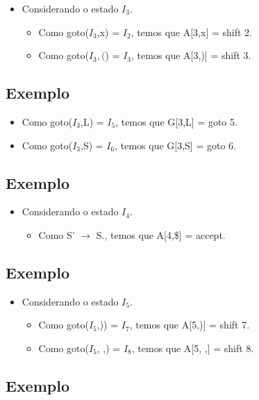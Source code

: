 \documentclass[11pt]{article}
\begin{document}
\begin{itemize}
\item Considerando o estado \(I_3\).
\begin{itemize}
\item Como goto(\(I_3\),x) = \(I_2\), temos que A[3,x] = shift 2.
\item Como goto(\(I_3,(\)) = \(I_3\), temos que A[3,)] = shift 3.
\end{itemize}
\end{itemize}
\subsection*{Exemplo}
\label{sec:org52592b6}

\begin{itemize}
\item Como goto(\(I_3\),L) = \(I_5\), temos que G[3,L] = goto 5.
\item Como goto(\(I_3\),S) = \(I_6\), temos que G[3,S] = goto 6.
\end{itemize}
\subsection*{Exemplo}
\label{sec:org35f1ae7}

\begin{itemize}
\item Considerando o estado \(I_4\).
\begin{itemize}
\item Como S' \(\to\) S., temos que A[4,\$] = accept.
\end{itemize}
\end{itemize}
\subsection*{Exemplo}
\label{sec:orge904868}

\begin{itemize}
\item Considerando o estado \(I_5\).
\begin{itemize}
\item Como goto(\(I_5\),)) = \(I_7\), temos que A[5,)] = shift 7.
\item Como goto(\(I_5\), ,) = \(I_8\), temos que A[5, ,] = shift 8.
\end{itemize}
\end{itemize}
\subsection*{Exemplo}
\label{sec:org28dcfb9}
\end{document}
